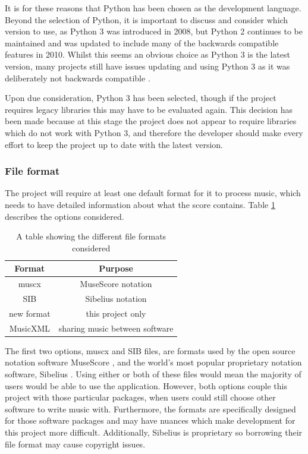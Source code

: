 It is for these reasons that Python has been chosen as the development language. Beyond the selection of Python, it is important to discuss and consider which version to use, as Python 3 was introduced in 2008, but Python 2 continues to be maintained and was updated to include many of the backwards compatible features in 2010. Whilst this seems an obvious choice as Python 3 is the latest version, many projects still have issues updating and using Python 3 as it was deliberately not backwards compatible \parencite{Foundation2}.

Upon due consideration, Python 3 has been selected, though if the project requires legacy libraries this may have to be evaluated again. This decision has been made because at this stage the project does not appear to require libraries which do not work with Python 3, and therefore the developer should make every effort to keep the project up to date with the latest version.

\subsubsection{File format}
The project will require at least one default format for it to process music, which needs to have detailed information about what the score contains. Table \ref{table:formats} describes the options considered.

\begin{table}[H]
\centering
\begin{tabular}{| c | c | } \hline
  {\textbf{Format}} & {\textbf{Purpose}} \\ \hline
  muscx & MuseScore notation \\ \hline
  SIB & Sibelius notation \\ \hline
  new format & this project only \\ \hline
  MusicXML & sharing music between software \\ \hline
\end{tabular}
\caption{A table showing the different file formats considered}
\label{table:formats}
\end{table}
The first two options, muscx and SIB files, are formats used by the open source notation software MuseScore \parencite{MuseTour}, and the world's most popular proprietary notation software, Sibelius \parencite{avid}. Using either or both of these files would mean the majority of users would be able to use the application. 
However, both options couple this project with those particular packages, when users could still choose other software to write music with. Furthermore, the formats are specifically designed for those software packages and may have nuances which make development for this project more difficult. Additionally, Sibelius is proprietary so borrowing their file format may cause copyright issues.

